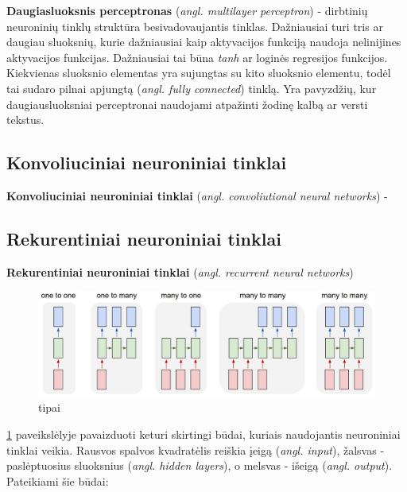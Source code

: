 \documentclass{VUMIFPSbakalaurinis}
\begin{document}
\textbf{Daugiasluoksnis perceptronas} (\textit{angl. multilayer perceptron}) - dirbtinių neuroninių tinklų struktūra besivadovaujantis tinklas. Dažniausiai turi tris ar daugiau sluoksnių, kurie dažniausiai kaip aktyvacijos funkciją naudoja nelinijines aktyvacijos funkcijas. Dažniausiai tai būna \textit{tanh} ar loginės regresijos funkcijos. Kiekvienas sluoksnio elementas yra sujungtas su kito sluoksnio elementu, todėl tai sudaro pilnai apjungtą (\textit{angl. fully connected}) tinklą. Yra pavyzdžių, kur daugiausluoksniai perceptronai naudojami atpažinti žodinę kalbą ar versti tekstus.


\subsection{Konvoliuciniai neuroniniai tinklai}

\textbf{Konvoliuciniai neuroniniai tinklai} (\textit{angl. convoliutional neural networks}) - 

\subsection{Rekurentiniai neuroniniai tinklai}

\textbf{Rekurentiniai neuroniniai tinklai} (\textit{angl. recurrent neural networks})

\begin{figure}[H]
	\centering
	\includegraphics[scale=0.3]{img/nn-tipai}
	\caption{ tipai}
	\label{img:tipai}
\end{figure}

\ref{img:tipai} paveikslėlyje pavaizduoti keturi skirtingi būdai, kuriais naudojantis neuroniniai tinklai veikia. Rausvos spalvos kvadratėlis reiškia įeigą (\textit{angl. input}), žalsvas - paslėptuosius sluoksnius (\textit{angl. hidden layers}), o melsvas - išeigą (\textit{angl. output}). Pateikiami šie būdai:
\end{document}
